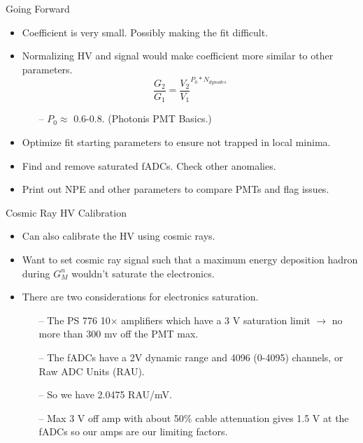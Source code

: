\documentclass[10pt]{beamer}
\begin{document}
\begin{frame}{Going Forward}

	\begin{itemize}
		\item Coefficient is very small. Possibly making the fit difficult. 
		\item Normalizing HV and signal would make coefficient more similar to other parameters.
		\begin{equation}
			\frac{G_2}{G_1} = \frac{V_2}{V_1}^{P_0 * N_{dynodes}}
		\end{equation}
			\begin{itemize}
				\item[--] $P_0 \approx$ 0.6-0.8. (Photonis PMT Basics.)  
			\end{itemize}
		\item Optimize fit starting parameters to ensure not trapped in local minima.
		\item Find and remove saturated fADCs. Check other anomalies.
		\item Print out NPE and other parameters to compare PMTs and flag issues.
	\end{itemize}

\end{frame}

\begin{frame}{Cosmic Ray HV Calibration}

	\begin{itemize}
		\item Can also calibrate the HV using cosmic rays.
		\item Want to set cosmic ray signal such that a maximum energy deposition hadron during $G_M^n$ wouldn't saturate the electronics.
		\item There are two considerations for electronics saturation.
			\begin{itemize}
				\item[--] The PS 776 10$\times$ amplifiers which have a 3 V saturation limit $\rightarrow$ no more than 300 mv off the PMT max.
				\item[--] The fADCs have a 2V dynamic range and 4096 (0-4095) channels, or Raw ADC Units (RAU).
				\item[--] So we have 2.0475 RAU/mV.
				\item[--] Max 3 V off amp with about 50\% cable attenuation gives 1.5 V at the fADCs so our amps are our limiting factors.
			\end{itemize}
	\end{itemize}

\end{frame}
\end{document}
